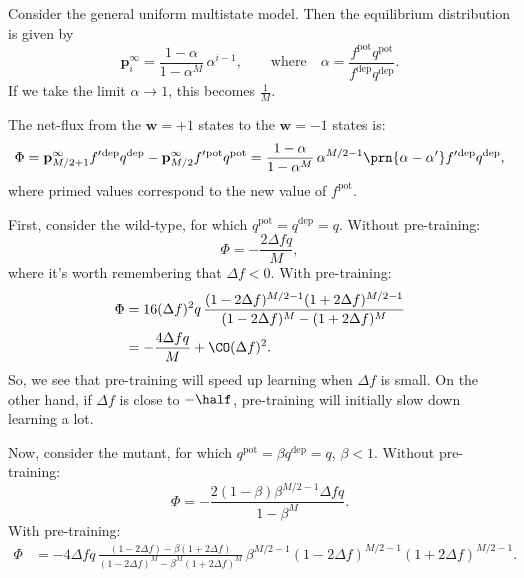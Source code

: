 \documentclass[12pt]{article}
\newcommand{\pr}{\mathbf{p}}
\newcommand{\eq}{\pr^\infty}
\newcommand{\w}{\mathbf{w}}
\newcommand{\pot}{^{\text{pot}}}
\newcommand{\dep}{^{\text{dep}}}
\begin{document}
Consider the general uniform multistate model.
Then the equilibrium distribution is given by
%
\begin{equation}\label{eq:mutltieq}
  \eq_i = \frac{1-\alpha}{1-\alpha^M}\,\alpha^{i-1},
  \qquad \text{where} \quad
  \alpha=\frac{f\pot q\pot}{f\dep q\dep}.
\end{equation}
%
If we take the limit $\alpha\rightarrow1$, this becomes $\frac{1}{M}$.

The net-flux from the $\w=+1$ states to the $\w=-1$ states is:
%
\begin{equation}\label{eq:multiflux}
  \Phi = \eq_{M/2+1}f'{}\dep q\dep - \eq_{M/2}f'{}\pot q\pot = \frac{1-\alpha}{1-\alpha^M}\,\alpha^{M/2-1}\prn{\alpha-\alpha'}f'{}\dep q\dep,
\end{equation}
%
where primed values correspond to the new value of $f\pot$.

First, consider the wild-type, for which $q\pot=q\dep=q$.
Without pre-training:
%
\begin{equation}\label{eq:multiWTnopre}
  \Phi = -\frac{2\Delta fq}{M},
\end{equation}
%
where it's worth remembering that $\Delta f<0$.
With pre-training:
%
\begin{equation}\label{eq:multiWTpre}
\begin{aligned}
  \Phi &= 16(\Delta f)^2q \, \frac{(1-2\Delta f)^{M/2-1} (1+2\Delta f)^{M/2-1}}
          {(1-2\Delta f)^M - (1+2\Delta f)^M} \\
       &= -\frac{4\Delta fq}{M} + \CO(\Delta f)^2.
\end{aligned}
\end{equation}
%
So, we see that pre-training will speed up learning when $\Delta f$ is small.
On the other hand, if $\Delta f$ is close to $-\half$, pre-training will initially slow down learning a lot.

Now, consider the mutant, for which $q\pot=\beta q\dep=q$, $\beta<1$.
Without pre-training:
%
\begin{equation}\label{eq:multiKOnopre}
  \Phi = -\frac{2(1-\beta)\beta^{M/2-1}\Delta fq}{1-\beta^M}.
\end{equation}
%
With pre-training:
%
\begin{equation}\label{eq:multiKOpre}
\begin{aligned}
  \Phi &= -4\Delta f q \, \frac{(1-2\Delta f) - \beta(1+2\Delta f)}
          {(1-2\Delta f)^M - \beta^M(1+2\Delta f)^M}   \,
          \beta^{M/2-1}(1-2\Delta f)^{M/2-1} (1+2\Delta f)^{M/2-1}.
\end{aligned}
\end{equation}
%
\end{document}
